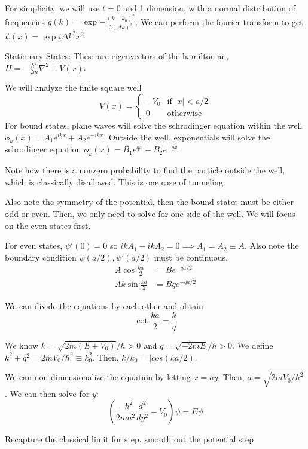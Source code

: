 \documentclass[12pt]{article}
\begin{document}
For simplicity, we will use $t=0$ and 1 dimension, with a normal distribution of frequencies $g(k)=\exp{-\frac{(k-k_0)^2}{2(\Delta k)^2}}$. We can perform the fourier transform to get $\psi(x)=\exp{i\Delta k^2 x^2}$

Stationary States: 
These are eigenvectors of the hamiltonian, $H=-\frac{\hbar^2}{2m}\nabla^2+V(x)$.

We will analyze the finite square well
\begin{equation}
    V(x) = \begin{cases}
        -V_0 & \text{if } |x|<a/2\\
        0 & \text{otherwise}
    \end{cases}
\end{equation}
For bound states, plane waves will solve the schrodinger equation within the well $\phi_k(x)=A_1e^{ikx}+A_2e^{-ikx}$. Outside the well, exponentials will solve the schrodinger equation $\phi_k(x)=B_1e^{qx}+B_2e^{-qx}$. 

Note how there is a nonzero probability to find the particle outside the well, which is classically disallowed. This is one case of tunneling.

Also note the symmetry of the potential, then the bound states must be either odd or even. Then, we only need to solve for one side of the well. We will focus on the even states first.

For even states, $\psi'(0)=0$ so $ikA_1-ikA_2=0\implies A_1=A_2\equiv A$. Also note the boundary condition $\psi(a/2), \psi'(a/2)$ must be continuous. 
\begin{align}
    A\cos\frac{ka}{2}&=Be^{-qa/2}\\
    Ak\sin\frac{ka}{2}&=Bqe^{-qa/2}
\end{align}

We can divide the equations by each other and obtain
\begin{equation}
    \cot\frac{ka}{2}=\frac{k}{q}
\end{equation}

We know $k=\sqrt{2m(E+V_0)}/\hbar>0$ and $q=\sqrt{-2mE}/\hbar>0$. We define $k^2+q^2=2mV_0/\hbar^2\equiv k_0^2$. Then, $k/k_0=|cos(ka/2)$.

We can non dimensionalize the equation by letting $x=ay$. Then, $a=\sqrt{2mV_0/\hbar^2}$. We can then solve for $y$:
\begin{equation}
    \left(\frac{-\hbar^2}{2ma^2}\frac{d^2}{dy^2}-V_0\right) \psi = E\psi
\end{equation}

Recapture the classical limit for step, smooth out the potential step
\end{document}
